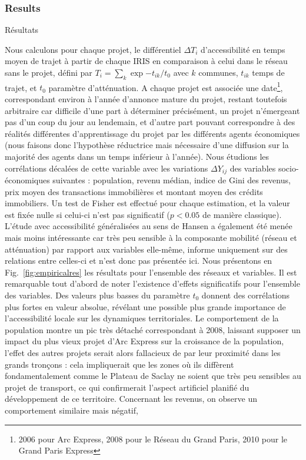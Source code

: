 \subsubsection{Results}{Résultats}








Nous calculons pour chaque projet, le différentiel $\Delta T_i$ d'accessibilité en temps moyen de trajet à partir de chaque IRIS en comparaison à celui dans le réseau sans le projet, défini par $T_i = \sum_k \exp{-t_{ik}/t_0}$ avec $k$ communes, $t_{ik}$ temps de trajet, et $t_0$ paramètre d'atténuation. A chaque projet est associée une date\footnote{2006 pour Arc Express, 2008 pour le Réseau du Grand Paris, 2010 pour le Grand Paris Express}, correspondant environ à l'année d'annonce mature du projet, restant toutefois arbitraire car difficile d'une part à déterminer précisément, un projet n'émergeant pas d'un coup du jour au lendemain, et d'autre part pouvant correspondre à des réalités différentes d'apprentissage du projet par les différents agents économiques (nous faisons donc l'hypothèse réductrice mais nécessaire d'une diffusion sur la majorité des agents dans un temps inférieur à l'année). Nous étudions les corrélations décalées de cette variable avec les variations $\Delta Y_{ij}$ des variables socio-économiques suivantes : population, revenu médian, indice de Gini des revenus, prix moyen des transactions immobilières et montant moyen des crédits immobiliers. Un test de Fisher est effectué pour chaque estimation, et la valeur est fixée nulle si celui-ci n'est pas significatif ($p<0.05$ de manière classique). L'étude avec accessibilité généralisées au sens de Hansen a également été menée mais moins intéressante car très peu sensible à la composante mobilité (réseau et atténuation) par rapport aux variables elle-même, informe uniquement sur des relations entre celles-ci et n'est donc pas présentée ici. Nous présentons en Fig.~\ref{fig:empiricalres} les résultats pour l'ensemble des réseaux et variables. Il est remarquable tout d'abord de noter l'existence d'effets significatifs pour l'ensemble des variables. Des valeurs plus basses du paramètre $t_0$ donnent des corrélations plus fortes en valeur absolue, révélant une possible plus grande importance de l'accessibilité locale sur les dynamiques territoriales. Le comportement de la population montre un pic très détaché correspondant à 2008, laissant supposer un impact du plus vieux projet d'Arc Express sur la croissance de la population, l'effet des autres projets serait alors fallacieux de par leur proximité dans les grands tronçons : cela impliquerait que les zones où ils diffèrent fondamentalement comme le Plateau de Saclay ne soient que très peu sensibles au projet de transport, ce qui confirmerait l'aspect artificiel planifié du développement de ce territoire. Concernant les revenus, on observe un comportement similaire mais négatif, 